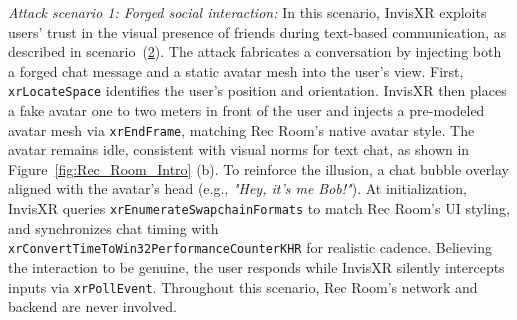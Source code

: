 \documentclass[letterpaper,twocolumn,10pt]{article}
\begin{document}
\textit{Attack scenario 1: Forged social interaction:}  In this scenario, InvisXR exploits users' trust in the visual presence of friends during text-based communication, as described in scenario~(\hyperlink{scenario 2}{2}). The attack fabricates a conversation by injecting both a forged chat message and a static avatar mesh into the user's view. First, \texttt{xrLocateSpace} identifies the user's position and orientation. InvisXR then places a fake avatar one to two meters in front of the user and injects a pre-modeled avatar mesh via \texttt{xrEndFrame}, matching Rec Room's native avatar style. The avatar remains idle, consistent with visual norms for text chat, as shown in Figure~\ref{fig:Rec_Room_Intro} (b). To reinforce the illusion, a chat bubble overlay aligned with the avatar's head (e.g., \textit{"Hey, it's me Bob!"}). At initialization, InvisXR queries \texttt{xrEnumerateSwapchainFormats} to match Rec Room's UI styling, and synchronizes chat timing with \texttt{xrConvertTimeToWin32PerformanceCounterKHR} for realistic cadence. Believing the interaction to be genuine, the user responds while InvisXR silently intercepts inputs via \texttt{xrPollEvent}. Throughout this scenario, Rec Room’s network and backend are never involved. 
\end{document}
